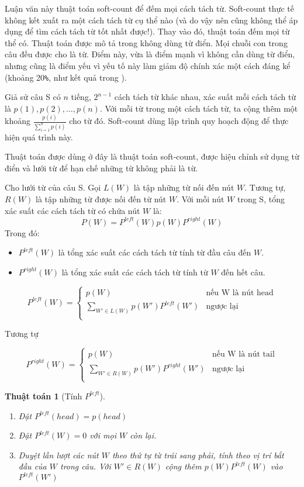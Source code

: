 \documentclass[a4paper,oneside]{book} %
\theoremstyle{break}
\newtheorem{algo}{Thuật toán}
\begin{document}
Luận văn này thuật toán soft-count để đếm mọi cách tách từ. Soft-count
thực tế không kết xuất ra một cách tách từ cụ thể nào (và do vậy nên
cũng không thể áp dụng để tìm cách tách từ tốt nhất được!). Thay vào
đó, thuật toán đếm mọi từ thể có. Thuật toán được mô tả trong
\cite{softcount} không dùng từ điển. Mọi chuỗi con trong câu đều được
cho là từ. Điểm này, vừa là điểm mạnh vì không cần dùng từ
điển, nhưng cũng là điểm yếu vì yếu tố này làm giảm độ chính xác một
cách đáng kể (khoảng 20\verb#%#, như kết quả trong \cite{softcount}).

Giả sử câu S có $n$ tiếng, $2^{n-1}$ cách tách từ khác nhau, xác suất
mỗi cách tách từ là $p(1),p(2),\ldots,p(n)$.
Với mỗi từ trong một cách tách từ, ta cộng thêm một khoảng
$\displaystyle\frac{p(i)}{\sum_{i=1}^n{p(i)}}$ cho từ đó. Soft-count dùng
lập trình quy hoạch động để thực hiện quá trình này.

Thuật toán được dùng ở đây là thuật toán soft-count, được hiệu chỉnh
sử dụng từ điển và lưới từ để hạn chế những từ không phải là từ.

Cho lưới từ của câu S. Gọi $L(W)$ là tập những từ nối đến nút
$W$. Tương tự, $R(W)$ là tập những từ được nối đến từ nút $W$.
Với mỗi nút $W$ trong S, tổng xác suất các cách tách từ có chứa nút
$W$ là:
$$P(W)=P^{left}(W)p(W)P^{right}(W)$$
Trong đó:
\begin{itemize}
\item $P^{left}(W)$ là tổng xác suất các cách tách từ tính từ đầu câu
  đến $W$.
\item $P^{right}(W)$ là tổng xác suất các cách tách từ tính từ $W$ đến
  hết câu.
\end{itemize}

$$
P^{left}(W) = \left\{
    \begin{array}{ll}
      p(W)&\text{nếu W là nút head}\\
      \displaystyle\sum_{W' \in L(W)}p(W')P^{left}(W')&\text{ngược lại}\\
    \end{array}
  \right.
$$

Tương tự

$$
P^{right}(W) = \left\{
    \begin{array}{ll}
      p(W)&\text{nếu W là nút tail}\\
      \displaystyle\sum_{W' \in R(W)}p(W')P^{right}(W')&\text{ngược lại}\\
    \end{array}
  \right.
$$

\begin{algo}[Tính $P^{left}$]
\begin{enumerate}
\item Đặt $P^{left}(head) = p(head)$
\item Đặt $P^{left}(W) = 0$ với mọi $W$ còn lại.
\item Duyệt lần lượt các nút $W$ theo thứ tự từ trái sang phải, tính
  theo vị trí bắt đầu của $W$ trong câu. Với $W' \in R(W)$
  cộng thêm $p(W)P^{left}(W)$ vào $P^{left}(W')$
\end{enumerate}
\end{algo}
\end{document}
